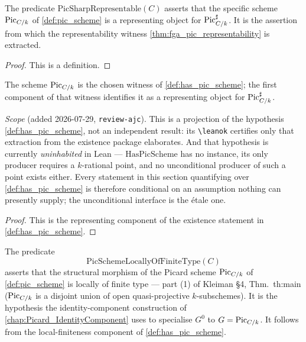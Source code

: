 \begin{definition}\leanok
  \label{def:pic_sharp_representable}
  The predicate \(\mathrm{PicSharpRepresentable}(C)\) asserts that the specific scheme
  \(\operatorname{Pic}_{C/k}\) of \cref{def:pic_scheme} is a representing object for
  \(\operatorname{Pic}^\sharp_{C/k}\). It is the assertion from which the representability
  witness \cref{thm:fga_pic_representability} is extracted.
\end{definition}

\begin{proof}
  This is a definition.
\end{proof}

\begin{definition}\leanok
  \label{def:inst_pic_sharp_representable}
  The scheme \(\operatorname{Pic}_{C/k}\) is the chosen witness of
  \cref{def:has_pic_scheme}; the first component of that witness identifies
  it as a representing object for \(\operatorname{Pic}^\sharp_{C/k}\).

  \emph{Scope} (added 2026-07-29, \texttt{review-ajc}). This is a projection of
  the hypothesis \cref{def:has_pic_scheme}, not an independent result: its
  \texttt{\textbackslash leanok} certifies only that extraction from the
  existence package elaborates. And that hypothesis is currently
  \emph{uninhabited} in Lean --- \(\mathrm{HasPicScheme}\) has no instance, its
  only producer requires a \(k\)-rational point, and no unconditional producer of
  such a point exists either. Every statement in this section quantifying over
  \cref{def:has_pic_scheme} is therefore conditional on an assumption nothing
  can presently supply; the unconditional interface is the \'etale one.
\end{definition}

\begin{proof}\leanok
  This is the representing component of the existence statement in
  \cref{def:has_pic_scheme}.
\end{proof}

\begin{definition}\leanok
  \label{def:pic_scheme_lft}
  The predicate
  \[
    \mathrm{PicSchemeLocallyOfFiniteType}(C)
  \]
  asserts that the
  structural morphism of the Picard scheme \(\operatorname{Pic}_{C/k}\) of
  \cref{def:pic_scheme} is locally of finite type --- part (1) of Kleiman
  \S 4, Thm.~th:main (\(\operatorname{Pic}_{C/k}\) is a disjoint union of open
  quasi-projective \(k\)-subschemes). It is the hypothesis the
  identity-component construction of
  \cref{chap:Picard_IdentityComponent} uses to specialise
  \(G^0\) to \(G = \operatorname{Pic}_{C/k}\). It follows from the local-finiteness
  component of \cref{def:has_pic_scheme}.
\end{definition}

